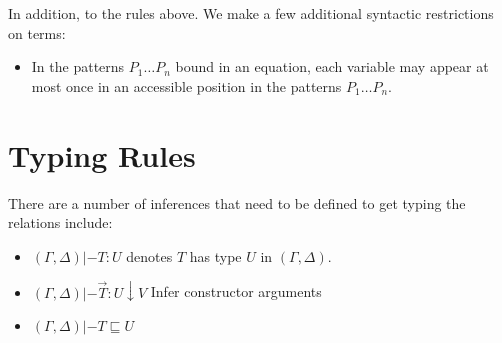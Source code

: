 \documentclass{article}
\newcommand{\rctor}[4]{#1 |- {#2} : {#3} \downarrow {#4}}
\newcommand{\ctx}[2]{(#1,#2)}
\begin{document}
In addition, to the rules above.  We make a few additional syntactic
restrictions on terms:
\begin{itemize}
  \item In the patterns $P_1 \dots P_n$ bound in an equation, each
    variable may appear at most once in an accessible position in the
    patterns $P_1 \dots P_n$.
\end{itemize}


\section{Typing Rules}

There are a number of inferences that need to be defined to get typing the relations include:

\newcommand{\defctx}{\ctx{\Gamma}{\Delta}}

\begin{itemize}
  \item $\defctx{} |- T : U$ denotes $T$ has type $U$ in $\defctx{}$.
  \item $\rctor{\defctx}{\vec{T}}{U}{V}$ Infer constructor arguments
  \item $\defctx{} |- T \sqsubseteq U$
\end{itemize}
\end{document}

